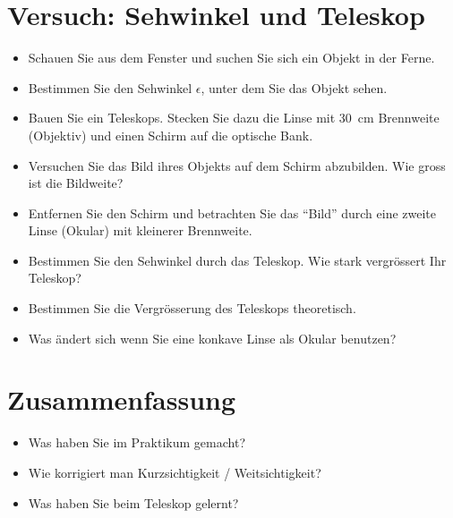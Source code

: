 \documentclass[12pt,a4paper, twosite]{article}
\begin{document}
\section*{Versuch: Sehwinkel und Teleskop}
\begin{itemize}
	\item Schauen Sie aus dem Fenster und suchen Sie sich ein Objekt in der Ferne.
	\item Bestimmen Sie den Sehwinkel $\epsilon$, unter dem Sie das Objekt sehen.
	\item Bauen Sie ein Teleskops. Stecken Sie dazu die Linse mit \SI{30}{cm} Brennweite (Objektiv) und einen Schirm auf die optische Bank.
	\item Versuchen Sie das Bild ihres Objekts auf dem Schirm abzubilden. Wie gross ist die Bildweite?
	\item Entfernen Sie den Schirm und betrachten Sie das ``Bild'' durch eine zweite Linse (Okular) mit kleinerer Brennweite.
	\item Bestimmen Sie den Sehwinkel durch das Teleskop. Wie stark vergrössert Ihr Teleskop?
	\item Bestimmen Sie die Vergrösserung des Teleskops theoretisch.
	\item Was ändert sich wenn Sie eine konkave Linse als Okular benutzen?
\end{itemize}

\section*{Zusammenfassung}
\begin{itemize}
	\item Was haben Sie im Praktikum gemacht?
	\item Wie korrigiert man Kurzsichtigkeit / Weitsichtigkeit?
	\item Was haben Sie beim Teleskop gelernt?
\end{itemize}
\end{document}
